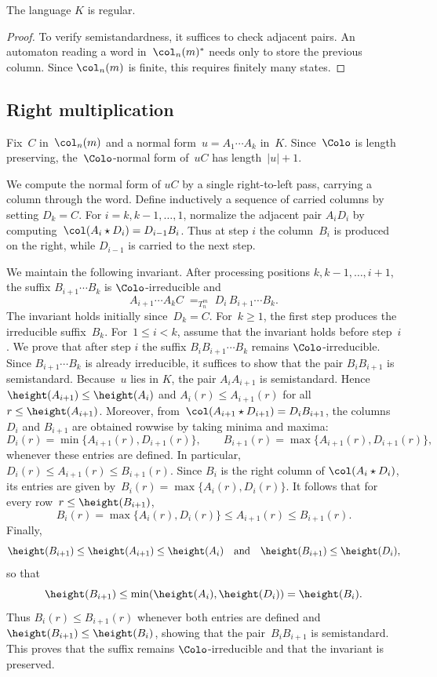 \documentclass[a4paper, twoside, 11pt, english]{article}
\begin{document}
\begin{lemma}
The language $K$ is regular.
\end{lemma}

\begin{proof}
To verify semistandardness, it suffices to check adjacent pairs.
An automaton reading a word in~$\col_n(m)^*$ needs only to store the
previous column.
Since $\col_n(m)$ is finite, this requires finitely many states.
\end{proof}


\subsection{Right multiplication}

Fix~$C$ in~$\col_n(m)$ and a normal form~$u=A_1\cdots A_k$ in~$K$.
Since~$\Colo$ is length preserving, the~$\Colo$-normal form of~$uC$ has
length~$|u|+1$.

We compute the normal form of $uC$ by a single right-to-left pass,
carrying a column through the word.
Define inductively a sequence of carried columns by setting $D_k=C$.
For $i=k,k-1,\dots,1$, normalize the adjacent pair $A_iD_i$ by computing~$\col(A_i\star D_i)=D_{i-1}B_i$.
Thus at step $i$ the column~$B_i$ is produced on the right, while
$D_{i-1}$ is carried to the next step.

We maintain the following invariant.
After processing positions $k,k-1,\dots,i+1$, the suffix
$B_{i+1}\cdots B_k$ is $\Colo$-irreducible and
\[
A_{i+1}\cdots A_k C \; =_{T_n^m}\; D_i\,B_{i+1}\cdots B_k.
\]
The invariant holds initially since~$D_k=C$.
For~$k\ge1$, the first step produces the irreducible suffix~$B_k$.
For~$1\le i<k$, assume that the invariant holds before step~$i$.
We prove that after step $i$ the suffix
$B_iB_{i+1}\cdots B_k$ remains $\Colo$-irreducible.
Since $B_{i+1}\cdots B_k$ is already irreducible, it suffices to show
that the pair $B_iB_{i+1}$ is semistandard.
Because~$u$ lies in $K$, the pair $A_iA_{i+1}$ is semistandard.
Hence $\height(A_{i+1})\le \height(A_i)$ and
$A_i(r)\le A_{i+1}(r)$ for all~$r\le \height(A_{i+1})$.
Moreover, from~$\col(A_{i+1}\star D_{i+1})=D_iB_{i+1}$,
the columns $D_i$ and $B_{i+1}$ are obtained rowwise by taking minima
and maxima:
\[
D_i(r)=\min\{A_{i+1}(r),D_{i+1}(r)\},
\qquad
B_{i+1}(r)=\max\{A_{i+1}(r),D_{i+1}(r)\},
\]
whenever these entries are defined.
In particular,~$D_i(r)\le A_{i+1}(r)\le B_{i+1}(r)$.
Since $B_i$ is the right column of $\col(A_i\star D_i)$, its entries are
given by~$B_i(r)=\max\{A_i(r),D_i(r)\}$.
It follows that for every row~$r\le \height(B_{i+1})$,
\[
B_i(r)=\max\{A_i(r),D_i(r)\}\le A_{i+1}(r)\le B_{i+1}(r).
\]
Finally,
\[
\height(B_{i+1})
\le \height(A_{i+1})
\le \height(A_i)
\quad\text{and}\quad
\height(B_{i+1})\le \height(D_i),
\]
so that
\[
\height(B_{i+1})
\le \min(\height(A_i),\height(D_i))
= \height(B_i).
\]
Thus $B_i(r)\le B_{i+1}(r)$ whenever both entries are defined and
$\height(B_{i+1})\le \height(B_i)$, showing that the pair~$B_iB_{i+1}$
is semistandard.
This proves that the suffix remains $\Colo$-irreducible and that the
invariant is preserved.
\end{document}
